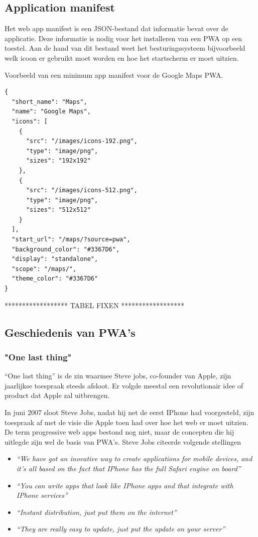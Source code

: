 \subsection{Application manifest}
Het web app manifest is een JSON-bestand dat informatie bevat over de applicatie. Deze informatie is nodig voor het installeren van een PWA op een toestel.
Aan de hand van dit bestand weet het besturingssysteem bijvoorbeeld welk icoon er gebruikt moet worden en hoe het startscherm er moet uitzien.

Voorbeeld van een minimum app manifest voor de Google Maps PWA.

\begin{lstlisting}
{
  "short_name": "Maps",
  "name": "Google Maps",
  "icons": [
    {
      "src": "/images/icons-192.png",
      "type": "image/png",
      "sizes": "192x192"
    },
    {
      "src": "/images/icons-512.png",
      "type": "image/png",
      "sizes": "512x512"
    }
  ],
  "start_url": "/maps/?source=pwa",
  "background_color": "#3367D6",
  "display": "standalone",
  "scope": "/maps/",
  "theme_color": "#3367D6"
}
\end{lstlisting}






****************** TABEL FIXEN  ******************

\autocite{LePage2020}

\subsection{Geschiedenis van PWA's}

\subsubsection{"One last thing"}

 “One last thing” is de zin waarmee Steve jobs, co-founder van Apple, zijn jaarlijkse toespraak steeds afsloot. Er volgde meestal een revolutionair idee of product dat Apple zal uitbrengen.

In juni 2007 sloot Steve Jobs, nadat hij net de eerst IPhone had voorgesteld, zijn toespraak af met de visie die Apple toen had over hoe het web er moet uitzien. De term progressive web apps bestond nog niet, maar de concepten die hij uitlegde zijn wel de basis van PWA’s. Steve Jobs citeerde volgende stellingen


\begin{itemize}
	\item \textit{ “We have got an inovative way to create applications for mobile devices, and it’s all based on the fact that IPhone has the full Safari engine on board”}
	\item \textit{ “You can write apps that look like IPhone apps and that integrate with IPhone services”}
	\item \textit{ “Instant distribution, just put them on the internet”}
	\item \textit{ “They are really easy to update, just put the update on your server”}
\end{itemize}

